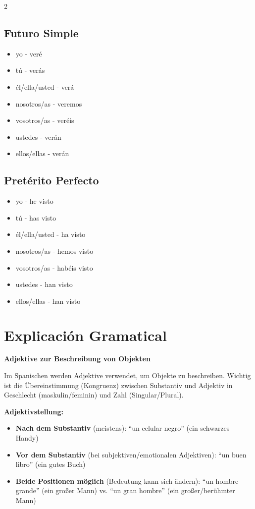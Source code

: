 \documentclass[12pt,a4paper]{article}
\begin{document}
\begin{multicols}{2}
\columnbreak

\subsection*{Futuro Simple}
\begin{itemize}[leftmargin=*]
    \item yo - veré
    \item tú - verás
    \item él/ella/usted - verá
    \item nosotros/as - veremos
    \item vosotros/as - veréis
    \item ustedes - verán
    \item ellos/ellas - verán
\end{itemize}

\subsection*{Pretérito Perfecto}
\begin{itemize}[leftmargin=*]
    \item yo - he visto
    \item tú - has visto
    \item él/ella/usted - ha visto
    \item nosotros/as - hemos visto
    \item vosotros/as - habéis visto
    \item ustedes - han visto
    \item ellos/ellas - han visto
\end{itemize}

\end{multicols}

\newpage

\section*{Explicación Gramatical}

\textbf{Adjektive zur Beschreibung von Objekten}

Im Spanischen werden Adjektive verwendet, um Objekte zu beschreiben. Wichtig ist die Übereinstimmung (Kongruenz) zwischen Substantiv und Adjektiv in Geschlecht (maskulin/feminin) und Zahl (Singular/Plural).

\textbf{Adjektivstellung:}
\begin{itemize}[leftmargin=*]
    \item \textbf{Nach dem Substantiv} (meistens): \enquote{un celular negro} (ein schwarzes Handy)
    \item \textbf{Vor dem Substantiv} (bei subjektiven/emotionalen Adjektiven): \enquote{un buen libro} (ein gutes Buch)
    \item \textbf{Beide Positionen möglich} (Bedeutung kann sich ändern): \enquote{un hombre grande} (ein großer Mann) vs. \enquote{un gran hombre} (ein großer/berühmter Mann)
\end{itemize}
\end{document}
